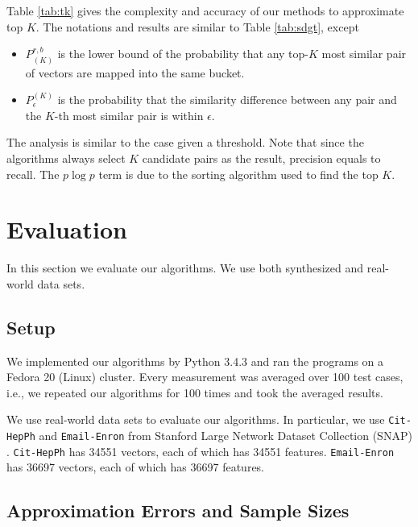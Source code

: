 \documentclass[sigconf,anonymous]{acmart}
\begin{document}
Table \ref{tab:tk} gives the complexity and accuracy of our methods to approximate top $K$. The notations and results are similar to Table \ref{tab:sdgt}, except
\begin{itemize}
\item $P_{(K)}^{r,b}$ is the lower bound of the probability that any top-$K$ most similar pair of vectors are mapped into the same bucket. 
\item $P_\epsilon^{(K)}$ is the probability that the similarity difference between any pair and the $K$-th most similar pair is within $\epsilon$.
\end{itemize}
The analysis is similar to the case given a threshold. Note that since the algorithms always select $K$ candidate pairs as the result, precision equals to recall. The $p \log p$ term is due to the sorting algorithm used to find the top $K$.

\section{Evaluation}
\label{sec:eval}
In this section we evaluate our algorithms. We use both synthesized and real-world data sets.

\subsection{Setup}
We implemented our algorithms by Python 3.4.3 and ran the programs on a Fedora 20 (Linux) cluster. Every measurement was averaged over 100 test cases, i.e., we repeated our algorithms for 100 times and took the averaged results.

We use real-world data sets to evaluate our algorithms. 
In particular, we use \texttt{Cit-HepPh} and \texttt{Email-Enron} from Stanford Large Network Dataset Collection (SNAP) \cite{LK15}. \texttt{Cit-HepPh} has 34551 vectors, each of which has 34551 features. \texttt{Email-Enron} has 36697 vectors, each of which has 36697 features.


\subsection{Approximation Errors and Sample Sizes}
\end{document}
